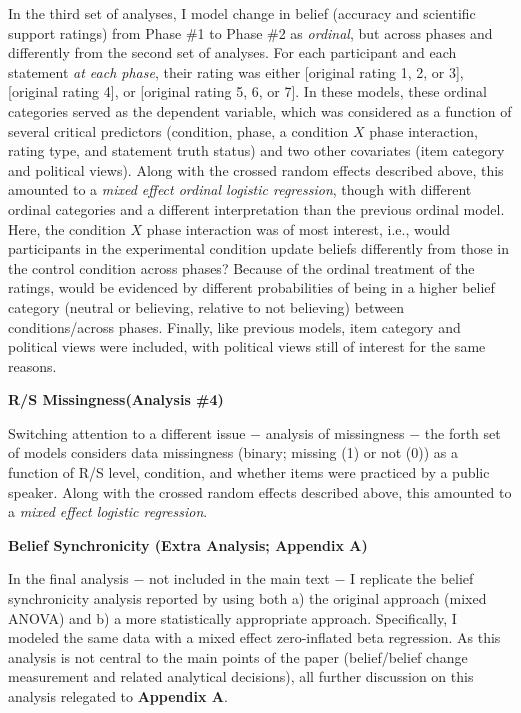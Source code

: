 \documentclass[12pt]{article}  %
\begin{document}
In the third set of analyses, I model change in belief (accuracy and scientific support ratings) from Phase \#1 to Phase \#2 as \textit{ordinal}, but across phases and differently from the second set of analyses. For each participant and each statement \textit{at each phase}, their rating was either  [original rating 1, 2, or 3],  [original rating 4], or  [original rating 5, 6, or 7]. In these models, these ordinal categories served as the dependent variable, which was considered as a function of several critical predictors (condition, phase, a condition $X$ phase interaction, rating type, and statement truth status) and two other covariates (item category and political views). Along with the crossed random effects described above, this amounted to a \textit{mixed effect ordinal logistic regression}, though with different ordinal categories and a different interpretation than the previous ordinal model. Here, the condition $X$ phase interaction was of most interest, i.e., would participants in the experimental condition update beliefs differently from those in the control condition across phases? Because of the ordinal treatment of the ratings,  would be evidenced by different probabilities of being in a higher belief category (neutral or believing, relative to not believing) between conditions/across phases. Finally, like previous models, item category and political views were included, with political views still of interest for the same reasons.

\noindent\textbf{R/S Missingness(Analysis \#4)}

Switching attention to a different issue $-$ analysis of missingness $-$ the forth set of models considers data missingness (binary; missing (1) or not (0)) as a function of R/S level, condition, and whether items were practiced by a public speaker. Along with the crossed random effects described above, this amounted to a \textit{mixed effect logistic regression}.

\noindent\textbf{Belief Synchronicity (Extra Analysis; Appendix A)}

In the final analysis $-$ not included in the main text $-$ I replicate the belief synchronicity analysis reported by \textcite{vlasceanu_synchronization_2020} using both a) the original approach (mixed ANOVA) and b) a more statistically appropriate approach. Specifically, I modeled the same data with a mixed effect zero-inflated beta regression. As this analysis is not central to the main points of the paper (belief/belief change measurement and related analytical decisions), all further discussion on this analysis relegated to \textbf{Appendix A}.
\end{document}
